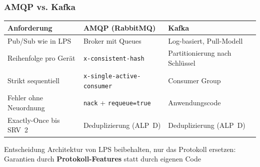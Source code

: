 \documentclass[11pt,aspectratio=1610]{beamer} %
\begin{document}
\begin{frame}
    \frametitle{AMQP vs. Kafka}

    \small
    \begin{tabularx}{\linewidth}{@{}L L L@{}}
        \toprule
        \textbf{Anforderung}   & \textbf{AMQP (RabbitMQ)}              & \textbf{Kafka}                 \\
        \midrule
        Pub/Sub wie in LPS     & Broker mit Queues                     & Log-basiert, Pull-Modell       \\
        Reihenfolge pro Gerät  & \texttt{x-consistent-hash}            & Partitionierung nach Schlüssel \\
        Strikt sequentiell     & \texttt{x-single-active-consumer}     & Consumer Group                 \\
        Fehler ohne Neuordnung & \texttt{nack} + \texttt{requeue=true} & Anwendungscode                 \\
        Exactly-Once bis SRV~2 & Deduplizierung (ALP~D)                & Deduplizierung (ALP~D)         \\
        \bottomrule
    \end{tabularx}

    \bigskip

    \begin{block}{Entscheidung}
        Architektur von LPS beibehalten, nur das Protokoll ersetzen: Garantien durch \textbf{Protokoll-Features} statt durch eigenen Code
    \end{block}
\end{frame}
\end{document}
